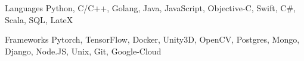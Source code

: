 
\begin{cvskills}
  \cvskill
    {Languages} %
    {Python, C/C++, Golang, Java, JavaScript, Objective-C, Swift, C\#, Scala, SQL, LateX} %

  \cvskill
    {Frameworks} %
    {Pytorch, TensorFlow, Docker, Unity3D, OpenCV, Postgres, Mongo, Django, Node.JS, Unix, Git, Google-Cloud} %
\end{cvskills}
